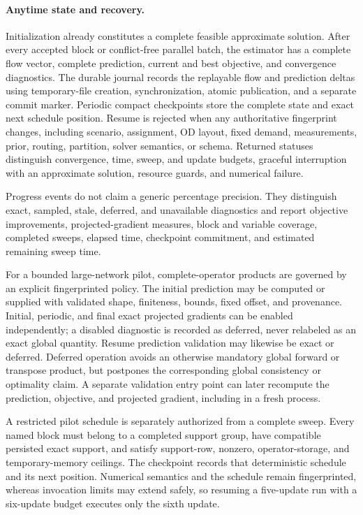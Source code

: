 \paragraph{Anytime state and recovery.}
Initialization already constitutes a complete feasible approximate solution.
After every accepted block or conflict-free parallel batch, the estimator has a
complete flow vector, complete prediction, current and best objective, and
convergence diagnostics.  The durable journal records the replayable flow and
prediction deltas using temporary-file creation, synchronization, atomic
publication, and a separate commit marker.  Periodic compact checkpoints store
the complete state and exact next schedule position.  Resume is rejected when
any authoritative fingerprint changes, including scenario, assignment, OD
layout, fixed demand, measurements, prior, routing, partition, solver semantics,
or schema.  Returned statuses distinguish convergence, time, sweep, and update
budgets, graceful interruption with an approximate solution, resource guards,
and numerical failure.

Progress events do not claim a generic percentage precision.  They distinguish
exact, sampled, stale, deferred, and unavailable diagnostics and report objective
improvements, projected-gradient measures, block and variable coverage,
completed sweeps, elapsed time, checkpoint commitment, and estimated remaining
sweep time.

For a bounded large-network pilot, complete-operator products are governed by
an explicit fingerprinted policy.  The initial prediction may be computed or
supplied with validated shape, finiteness, bounds, fixed offset, and provenance.
Initial, periodic, and final exact projected gradients can be enabled
independently; a disabled diagnostic is recorded as deferred, never relabeled as
an exact global quantity.  Resume prediction validation may likewise be exact
or deferred.  Deferred operation avoids an otherwise mandatory global forward
or transpose product, but postpones the corresponding global consistency or
optimality claim.  A separate validation entry point can later recompute the
prediction, objective, and projected gradient, including in a fresh process.

A restricted pilot schedule is separately authorized from a complete sweep.
Every named block must belong to a completed support group, have compatible
persisted exact support, and satisfy support-row, nonzero, operator-storage, and
temporary-memory ceilings.  The checkpoint records that deterministic schedule
and its next position. Numerical semantics and the schedule remain
fingerprinted, whereas invocation limits may extend safely, so resuming a
five-update run with a six-update budget executes only the sixth update.

